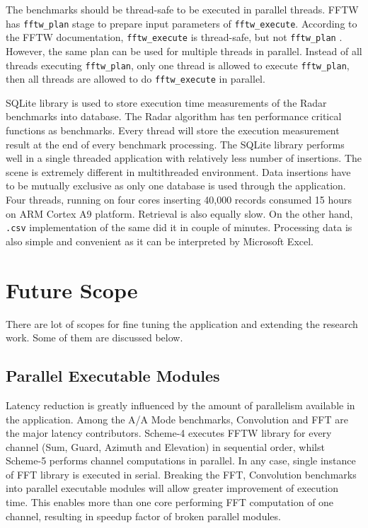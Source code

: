 The benchmarks should be thread-safe to be executed in parallel threads. FFTW has \verb|fftw_plan| stage to prepare input parameters of \verb|fftw_execute|. According to the FFTW documentation, \verb|fftw_execute| is thread-safe, but not \verb|fftw_plan| \cite{fftThreadSafe}. However, the same plan can be used for multiple threads in parallel. Instead of all threads executing \verb|fftw_plan|, only one thread is allowed to execute \verb|fftw_plan|, then all threads are allowed to do \verb|fftw_execute| in parallel. \vspace*{0.3cm}

SQLite library is used to store execution time measurements of the Radar benchmarks into database. The Radar algorithm has ten performance critical functions as benchmarks. Every thread will store the execution measurement result at the end of every benchmark processing. The SQLite library performs well in a single threaded application with relatively less number of insertions. The scene is extremely different in multithreaded environment. Data insertions have to be mutually exclusive as only one database is used through the application. Four threads, running on four cores inserting 40,000 records consumed 15 hours on ARM Cortex A9 platform. Retrieval is also equally slow. On the other hand, \verb|.csv| implementation of the same did it in couple of minutes. Processing data is also simple and convenient as it can be interpreted by Microsoft Excel.


\section{Future Scope}
There are lot of scopes for fine tuning the application and extending the research work. Some of them are discussed below.

\subsection{Parallel Executable Modules}
Latency reduction is greatly influenced by the amount of parallelism available in the application. Among the A/A Mode benchmarks, Convolution and FFT are the major latency contributors. Scheme-4 executes FFTW library for every channel (Sum, Guard, Azimuth and Elevation) in sequential order, whilst Scheme-5 performs channel computations in parallel. In any case, single instance of FFT library is executed in serial. Breaking the FFT, Convolution benchmarks into parallel executable modules will allow greater improvement of execution time. This enables more than one core performing FFT computation of one channel, resulting in speedup factor of broken parallel modules. \vspace*{0.2cm}

